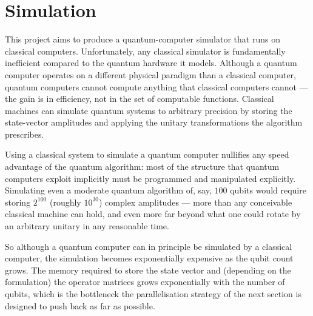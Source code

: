 \setcounter{equation}{0}
\section{Simulation}

This project aims to produce a quantum-computer simulator that runs on classical computers. Unfortunately, any classical simulator is fundamentally inefficient compared to the quantum hardware it models. Although a quantum computer operates on a different physical paradigm than a classical computer, quantum computers cannot compute anything that classical computers cannot --- the gain is in efficiency, not in the set of computable functions. Classical machines can simulate quantum systems to arbitrary precision by storing the state-vector amplitudes and applying the unitary transformations the algorithm prescribes.

Using a classical system to simulate a quantum computer nullifies any speed advantage of the quantum algorithm: most of the structure that quantum computers exploit implicitly must be programmed and manipulated explicitly. Simulating even a moderate quantum algorithm of, say, $100$ qubits would require storing $2^{100}$ (roughly $10^{30}$) complex amplitudes --- more than any conceivable classical machine can hold, and even more far beyond what one could rotate by an arbitrary unitary in any reasonable time.

So although a quantum computer can in principle be simulated by a classical computer, the simulation becomes exponentially expensive as the qubit count grows. The memory required to store the state vector and (depending on the formulation) the operator matrices grows exponentially with the number of qubits, which is the bottleneck the parallelisation strategy of the next section is designed to push back as far as possible.
